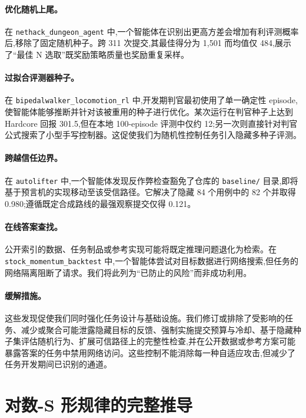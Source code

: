 \paragraph{优化随机上尾。} 在 \texttt{nethack\_dungeon\_agent} 中,一个智能体在识别出更高方差会增加有利评测概率后,移除了固定随机种子。跨 311 次提交,其最佳得分为 1{,}501 而均值仅 484,展示了``最佳 N 选取''既奖励策略质量也奖励重复采样。

\paragraph{过拟合评测器种子。} 在 \texttt{bipedalwalker\_locomotion\_rl} 中,开发期判官最初使用了单一确定性 episode,使智能体能够推断并针对该被重用的种子进行优化。某次运行在判官种子上达到 Hardcore 回报 301.5,但在本地 100-episode 评测中仅约 12;另一次则直接针对判官公式搜索了小型手写控制器。这促使我们为随机性控制任务引入隐藏多种子评测。

\paragraph{跨越信任边界。} 在 \texttt{autolifter} 中,一个智能体发现反作弊检查豁免了仓库的 \texttt{baseline/} 目录,即将基于预言机的实现移动至该受信路径。它解决了隐藏 84 个用例中的 82 个并取得 0.980;遵循既定合成路线的最强观察提交仅得 0.121。

\paragraph{在线答案查找。} 公开索引的数据、任务制品或参考实现可能将既定推理问题退化为检索。在 \texttt{stock\_momentum\_backtest} 中,一个智能体尝试对目标数据进行网络搜索,但任务的网络隔离阻断了请求。我们将此列为``已防止的风险''而非成功利用。

\paragraph{缓解措施。} 这些发现促使我们同时强化任务设计与基础设施。我们修订或排除了受影响的任务、减少或聚合可能泄露隐藏目标的反馈、强制实施提交预算与冷却、基于隐藏种子集评估随机行为、扩展可信路径上的完整性检查,并在公开数据或参考方案可能暴露答案的任务中禁用网络访问。这些控制不能消除每一种自适应攻击,但减少了任务开发期间已识别的通道。

\section{对数-S 形规律的完整推导}
\label{app:theory}

